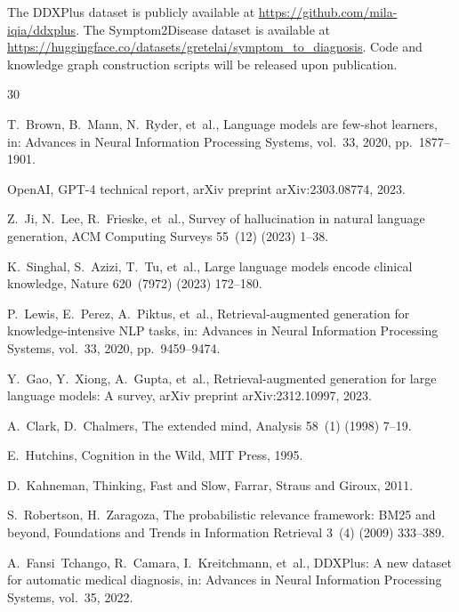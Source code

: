 \documentclass[preprint,12pt]{elsarticle}
\begin{document}
The DDXPlus dataset is publicly available at \url{https://github.com/mila-iqia/ddxplus}. The Symptom2Disease dataset is available at \url{https://huggingface.co/datasets/gretelai/symptom_to_diagnosis}. Code and knowledge graph construction scripts will be released upon publication.



\begin{thebibliography}{30}

T.~Brown, B.~Mann, N.~Ryder, et~al., Language models are few-shot learners, in: Advances in Neural Information Processing Systems, vol.~33, 2020, pp.~1877--1901.

OpenAI, GPT-4 technical report, arXiv preprint arXiv:2303.08774, 2023.

Z.~Ji, N.~Lee, R.~Frieske, et~al., Survey of hallucination in natural language generation, ACM Computing Surveys 55~(12) (2023) 1--38.

K.~Singhal, S.~Azizi, T.~Tu, et~al., Large language models encode clinical knowledge, Nature 620~(7972) (2023) 172--180.

P.~Lewis, E.~Perez, A.~Piktus, et~al., Retrieval-augmented generation for knowledge-intensive NLP tasks, in: Advances in Neural Information Processing Systems, vol.~33, 2020, pp.~9459--9474.

Y.~Gao, Y.~Xiong, A.~Gupta, et~al., Retrieval-augmented generation for large language models: A survey, arXiv preprint arXiv:2312.10997, 2023.

A.~Clark, D.~Chalmers, The extended mind, Analysis 58~(1) (1998) 7--19.

E.~Hutchins, Cognition in the Wild, MIT Press, 1995.

D.~Kahneman, Thinking, Fast and Slow, Farrar, Straus and Giroux, 2011.

S.~Robertson, H.~Zaragoza, The probabilistic relevance framework: BM25 and beyond, Foundations and Trends in Information Retrieval 3~(4) (2009) 333--389.

A.~Fansi~Tchango, R.~Camara, I.~Kreitchmann, et~al., DDXPlus: A new dataset for automatic medical diagnosis, in: Advances in Neural Information Processing Systems, vol.~35, 2022.


\end{thebibliography}
\end{document}

